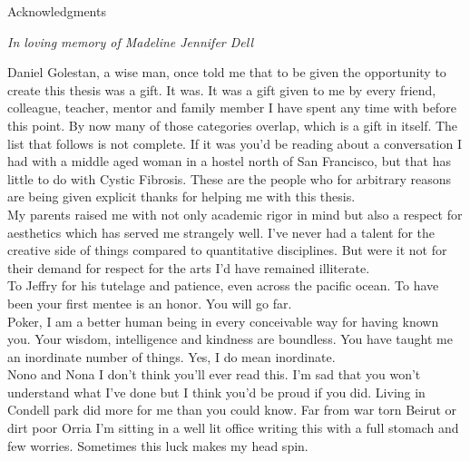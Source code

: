 \newpage

\vspace{3in}

\begin{center}
\begin{Large}
\begin{bfseries}
Acknowledgments
\end{bfseries}
\end{Large}
\end{center}

\vspace{0.5in}


\vspace{1.0in}
\textit {In loving memory of Madeline Jennifer Dell} \\
\clearpage

 Daniel Golestan, a wise man, once told me that to be given the opportunity to create this thesis was a gift. It was. It was a gift given to me by every friend, colleague, teacher, mentor and family member I have spent any time with before this point. By now many of those categories overlap, which is a gift in itself. The list that follows is not complete. If it was you'd be reading about a conversation I had with a middle aged woman in a hostel north of San Francisco, but that has little to do with Cystic Fibrosis. These are the people who for arbitrary reasons are being given explicit thanks for helping me with this thesis. \\

My parents raised me with not only academic rigor in mind but also a respect for aesthetics which has served me strangely well. I've never had a talent for the creative side of things compared to quantitative disciplines. But were it not for their demand for respect for the arts I'd have remained illiterate. \\

To Jeffry for his tutelage and patience, even across the pacific ocean. To have been your first mentee is an honor. You will go far. \\

Poker, I am a better human being in every conceivable way for having known you. Your wisdom, intelligence and kindness are boundless. You have taught me an inordinate number of things. Yes, I do mean inordinate. \\

Nono and Nona I don't think you'll ever read this. I'm sad that you won't understand what I've done but I think you'd be proud if you did. Living in Condell park did more for me than you could know. Far from war torn Beirut or dirt poor Orria I'm sitting in a well lit office writing this with a full stomach and few worries. Sometimes this luck makes my head spin. \\

